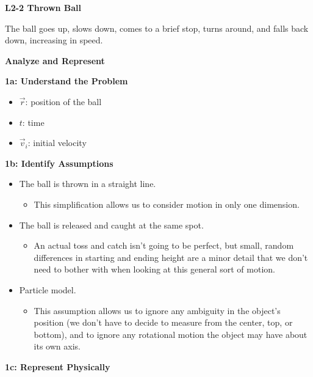 \documentclass[]{article}
\begin{document}
\begin{TeacherMargin}
\noindent\textbf{L2-2 Thrown Ball}

The ball goes up, slows down, comes to a brief stop, turns around, and falls back down, increasing in speed.

\noindent\textbf{Analyze and Represent}

\noindent\textbf{1a: Understand the Problem}
\begin{itemize}
	\item $\vec{r}$: position of the ball
	\item $t$: time
	\item $\vec{v}_{i}$: initial velocity
\end{itemize}
\noindent\textbf{1b: Identify Assumptions}
\begin{itemize}
	\item The ball is thrown in a straight line.
	\begin{itemize}
		\item This simplification allows us to consider motion in only one dimension.
	\end{itemize}
	\item The ball is released and caught at the same spot.
	\begin{itemize}
		\item An actual toss and catch isn't going to be perfect, but small, random differences in starting and ending height are a minor detail that we don't need to bother with when looking at this general sort of motion.
	\end{itemize}
	\item Particle model.
	\begin{itemize}
		\item This assumption allows us to ignore any ambiguity in the object's position (we don't have to decide to measure from the center, top, or bottom), and to ignore any rotational motion the object may have about its own axis.
	\end{itemize}
\end{itemize}
\noindent\textbf{1c: Represent Physically}


\end{TeacherMargin}
\end{document}
